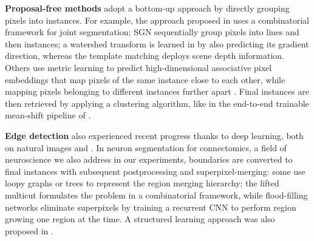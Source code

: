 \textbf{Proposal-free methods} adopt a bottom-up approach by directly grouping pixels into instances. For example, the approach proposed in \cite{kirillov2017instancecut} uses a combinatorial framework for joint segmentation; SGN \cite{liu2017sgn} sequentially group pixels into lines and then instances;
a watershed transform is learned in \cite{bai2017deep} by also predicting its gradient direction, whereas the template matching \cite{uhrig2016pixel} deploys scene depth information.
Others use metric learning to predict high-dimensional associative pixel embeddings that map pixels of the same instance close to each other, while mapping pixels belonging to different instances further apart \cite{fathi2017semantic,newell2017associative,de2017semantic,kulikov2018instance}. %
Final instances are then retrieved by applying a clustering algorithm, like in the end-to-end trainable mean-shift pipeline of \cite{kong2018recurrentPix}.

\textbf{Edge detection} also experienced recent progress thanks to deep learning, both on natural images \cite{xie2015holistically,kokkinos2015pushing} and . In neuron segmentation for connectomics, a field of neuroscience we also address in our experiments, boundaries are converted to final instances with subsequent postprocessing and superpixel-merging:
some use loopy graphs \cite{kaynig2015large,krasowski2015improving} or trees \cite{meirovitch2016multi,liu2016sshmt,liu2014modular,funke2015learning,uzunbas2016efficient} to represent the region merging hierarchy; the lifted multicut \cite{beier2017multicut} formulates the problem in a combinatorial framework, while flood-filling networks \cite{januszewski2018high} eliminate superpixels by training a recurrent CNN to perform region growing one region at the time. A structured learning approach was also proposed in \cite{funke2018large,turaga2009maximin}.

